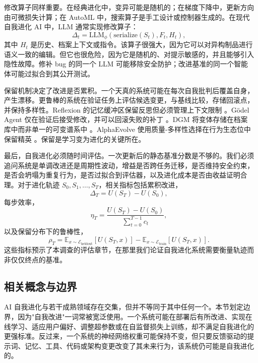 修改算子同样重要。在经典进化中，变异可能是随机的；在梯度下降中，更新方向由可微损失计算；在 AutoML 中，搜索算子是手工设计或控制器生成的。在现代自我进化 AI 中，LLM 通常实现修改算子：
\begin{equation}
\Delta_t = \mathrm{LLM}_{\phi}(\mathrm{serialize}(S_t), F_t, H_t),
\end{equation}
其中 $H_t$ 是历史、档案上下文或指令。该算子很强大，因为它可以对异构制品进行语义一致的编辑。但它也很危险，因为它是随机的、对提示敏感的，并且能够引入隐性故障。修补 bug 的同一个 LLM 可能移除安全防护；改进基准的同一个智能体可能过拟合到其公开测试。

保留机制决定了改进是否累积。一个天真的系统可能在每次自我批判后覆盖自身，产生漂移。更鲁棒的系统在验证任务上评估候选变更，与基线比较，存储回滚点，并保持多样性。Reflexion 的记忆缓冲区保留反思但必须管理上下文限制 \cite{reflexion2023}。G{\"o}del Agent 仅在验证后接受修改，并可以回滚失败的补丁 \cite{yin2024godel}。DGM 将变体存储在档案库中而非单一的可变谱系中 \cite{darwingodelmachine2025}。AlphaEvolve 使用质量-多样性选择在行为生态位中保留精英 \cite{alphaevolve2025}。保留是学习变为进化的关键所在。

最后，自我进化必须随时间评估。一次更新后的静态基准分数是不够的。我们必须追问系统是单调改进还是周期性波动，增益是否跨任务迁移，是否维持安全约束，是否会坍塌为重复行为，是否过拟合到评估器，以及进化成本是否由收益证明合理。对于进化轨迹 $S_0,S_1,\ldots,S_T$，相关指标包括累积改进，
\begin{equation}
\Delta_T = U(S_T)-U(S_0),
\end{equation}
每步效率，
\begin{equation}
\eta_T = \frac{U(S_T)-U(S_0)}{\sum_{t=0}^{T-1} c_t},
\end{equation}
以及保留分布下的鲁棒性，
\begin{equation}
\rho_T = \mathbb{E}_{x\sim\mathcal{E}_{\mathrm{heldout}}}[U(S_T,x)] - \mathbb{E}_{x\sim\mathcal{E}_{\mathrm{train}}}[U(S_T,x)].
\end{equation}
这些指标预示了本调查的评估章节，在那里我们论证自我进化系统需要衡量轨迹而非仅仅终点的基准。

\subsection{相关概念与边界}
\label{subsec:intro-related}

AI 自我进化与若干成熟领域存在交集，但并不等同于其中任何一个。本节划定边界，因为"自我改进"一词常被宽泛使用。一个系统可能在部署后有所改进、实现在线学习、适应用户偏好、调整超参数或在自监督损失上训练，却不满足自我进化的更强标准。反过来，一个系统的神经网络权重可能保持不变，但只要反馈驱动的提示词、记忆、工具、代码或架构变更改变了其未来行为，该系统仍可能是自我进化的。

